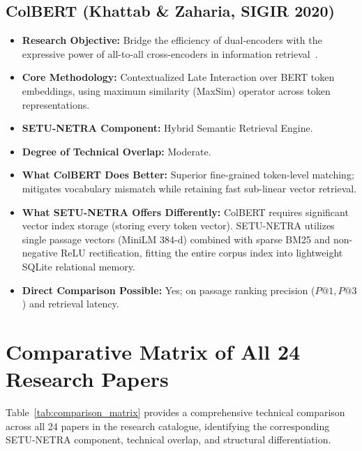 \documentclass[11pt,a4paper]{article}
\begin{document}
\subsection{ColBERT (Khattab \& Zaharia, SIGIR 2020)}
\begin{itemize}[leftmargin=*]
    \item \textbf{Research Objective:} Bridge the efficiency of dual-encoders with the expressive power of all-to-all cross-encoders in information retrieval~\cite{Khattab2020ColBERT}.
    \item \textbf{Core Methodology:} Contextualized Late Interaction over BERT token embeddings, using maximum similarity (MaxSim) operator across token representations.
    \item \textbf{SETU-NETRA Component:} Hybrid Semantic Retrieval Engine.
    \item \textbf{Degree of Technical Overlap:} Moderate.
    \item \textbf{What ColBERT Does Better:} Superior fine-grained token-level matching; mitigates vocabulary mismatch while retaining fast sub-linear vector retrieval.
    \item \textbf{What SETU-NETRA Offers Differently:} ColBERT requires significant vector index storage (storing every token vector). SETU-NETRA utilizes single passage vectors (MiniLM 384-d) combined with sparse BM25 and non-negative ReLU rectification, fitting the entire corpus index into lightweight SQLite relational memory.
    \item \textbf{Direct Comparison Possible:} Yes; on passage ranking precision ($P@1, P@3$) and retrieval latency.
\end{itemize}

\section{Comparative Matrix of All 24 Research Papers}
\label{sec:matrix}

Table~\ref{tab:comparison_matrix} provides a comprehensive technical comparison across all 24 papers in the research catalogue, identifying the corresponding SETU-NETRA component, technical overlap, and structural differentiation.
\end{document}

